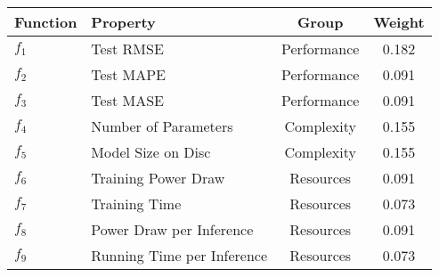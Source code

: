 
    \begin{tabular}{llcc}
        \toprule 
        Function & Property & Group & Weight \\
        \midrule
        $f_{1}$ & Test RMSE & Performance & 0.182 \\
        $f_{2}$ & Test MAPE & Performance & 0.091 \\
        $f_{3}$ & Test MASE & Performance & 0.091 \\
        $f_{4}$ & Number of Parameters & Complexity & 0.155 \\
        $f_{5}$ & Model Size on Disc & Complexity & 0.155 \\
        $f_{6}$ & Training Power Draw & Resources & 0.091 \\
        $f_{7}$ & Training Time & Resources & 0.073 \\
        $f_{8}$ & Power Draw per Inference & Resources & 0.091 \\
        $f_{9}$ & Running Time per Inference & Resources & 0.073 \\
        \bottomrule
    \end{tabular}